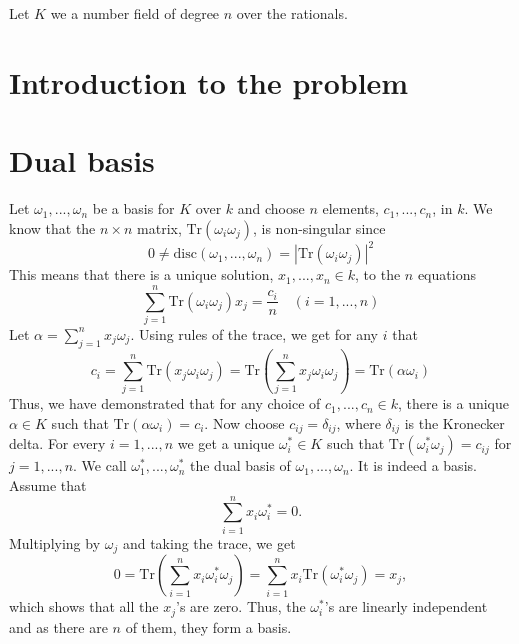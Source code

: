 \documentclass{article}
\newcommand{\tr}[1]{\text{Tr}(#1)}
\begin{document}

\tableofcontents



Let $K$ we a number field of degree $n$ over the rationals.






\section{Introduction to the problem}

\section{Dual basis}
Let $\omega_1, ..., \omega_n$ be a basis for $K$ over $k$ and choose $n$ elements, $c_1, ..., c_n$, in $k$. We know that the $n \times n$ matrix, $\tr {\omega_i \omega_j}$, is non-singular since $$0 \neq \text{disc}(\omega_1, ..., \omega_n) = |\tr{\omega_i \omega_j}|^2$$
This means that there is a unique solution, $x_1, ..., x_n \in k$, to the $n$ equations
$$\sum_{j=1}^n \tr{\omega_i \omega_j} x_j = \frac{c_i}{n} \quad (i = 1, ..., n)$$
Let $\alpha = \sum_{j=1}^n x_j \omega_j$. Using rules of the trace, we get for any $i$ that
$$c_i = \sum_{j=1}^n \tr{x_j \omega_i \omega_j} = \tr{\sum_{j=1}^n x_j \omega_i \omega_j} = \tr{\alpha \omega_i}$$
Thus, we have demonstrated that for any choice of $c_1, ..., c_n \in k$, there is a unique $\alpha \in K$ such that $\tr{\alpha \omega_i} = c_i$. Now choose $c_{ij} = \delta_{ij}$, where $\delta_{ij}$ is the Kronecker delta. For every $i = 1, ..., n$ we get a unique $\omega_i^* \in K$ such that $\tr{\omega_i^* \omega_j} = c_{ij}$ for $j = 1, ..., n$. We call $\omega_1^*, ..., \omega_n^*$ the dual basis of $\omega_1, ..., \omega_n$. It is indeed a basis. Assume that 
$$\sum_{i=1}^n x_i \omega_i^* = 0.$$
Multiplying by $\omega_j$ and taking the trace, we get
$$0 = \tr{\sum_{i=1}^n x_i \omega_i^* \omega_j} = \sum_{i=1}^n x_i \tr{\omega_i^* \omega_j} = x_j,$$
which shows that all the $x_j$'s are zero. Thus, the $\omega_i^*$'s are linearly independent and as there are $n$ of them, they form a basis.
\end{document}
